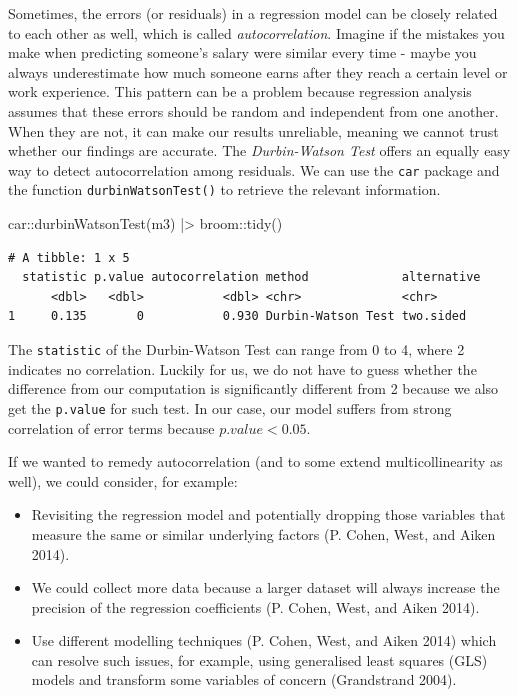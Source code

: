\documentclass[
  letterpaper,
]{krantz}
\makeatletter
\newenvironment{Shaded}{\begin{snugshade}}{\end{snugshade}}
\newcommand{\FunctionTok}[1]{\textcolor[rgb]{0.28,0.35,0.67}{#1}}
\newcommand{\NormalTok}[1]{\textcolor[rgb]{0.00,0.23,0.31}{#1}}
\newcommand{\SpecialCharTok}[1]{\textcolor[rgb]{0.37,0.37,0.37}{#1}}
\newenvironment{kframe}{%
\medskip{}
\setlength{\fboxsep}{.8em}
 \def\at@end@of@kframe{}%
 \ifinner\ifhmode%
  \def\at@end@of@kframe{\end{minipage}}%
  \begin{minipage}{\columnwidth}%
 \fi\fi%
 \def\FrameCommand##1{\hskip\@totalleftmargin \hskip-\fboxsep
 \colorbox{shadecolor}{##1}\hskip-\fboxsep
     \hskip-\linewidth \hskip-\@totalleftmargin \hskip\columnwidth}%
 \MakeFramed {\advance\hsize-\width
   \@totalleftmargin\z@ \linewidth\hsize
   \@setminipage}}%
 {\par\unskip\endMakeFramed%
 \at@end@of@kframe}
\renewenvironment{Shaded}{\begin{kframe}}{\end{kframe}}
\makeatother
\begin{document}
Sometimes, the errors (or residuals) in a regression model can be
closely related to each other as well, which is called
\emph{autocorrelation}. Imagine if the mistakes you make when predicting
someone's salary were similar every time - maybe you always
underestimate how much someone earns after they reach a certain level or
work experience. This pattern can be a problem because regression
analysis assumes that these errors should be random and independent from
one another. When they are not, it can make our results unreliable,
meaning we cannot trust whether our findings are accurate. The
\emph{Durbin-Watson Test} offers an equally easy way to detect
autocorrelation among residuals. We can use the \texttt{car} package and
the function \texttt{durbinWatsonTest()} to retrieve the relevant
information.

\begin{Shaded}
\begin{Highlighting}[]
\NormalTok{car}\SpecialCharTok{::}\FunctionTok{durbinWatsonTest}\NormalTok{(m3) }\SpecialCharTok{|\textgreater{}}
\NormalTok{  broom}\SpecialCharTok{::}\FunctionTok{tidy}\NormalTok{()}
\end{Highlighting}
\end{Shaded}

\begin{verbatim}
# A tibble: 1 x 5
  statistic p.value autocorrelation method             alternative
      <dbl>   <dbl>           <dbl> <chr>              <chr>      
1     0.135       0           0.930 Durbin-Watson Test two.sided  
\end{verbatim}

The \texttt{statistic} of the Durbin-Watson Test can range from 0 to 4,
where 2 indicates no correlation. Luckily for us, we do not have to
guess whether the difference from our computation is significantly
different from 2 because we also get the \texttt{p.value} for such test.
In our case, our model suffers from strong correlation of error terms
because \(p.value < 0.05\).

If we wanted to remedy autocorrelation (and to some extend
multicollinearity as well), we could consider, for example:

\begin{itemize}
\item
  Revisiting the regression model and potentially dropping those
  variables that measure the same or similar underlying factors (P.
  Cohen, West, and Aiken 2014).
\item
  We could collect more data because a larger dataset will always
  increase the precision of the regression coefficients (P. Cohen, West,
  and Aiken 2014).
\item
  Use different modelling techniques (P. Cohen, West, and Aiken 2014)
  which can resolve such issues, for example, using generalised least
  squares (GLS) models and transform some variables of concern
  (Grandstrand 2004).
\end{itemize}
\end{document}
